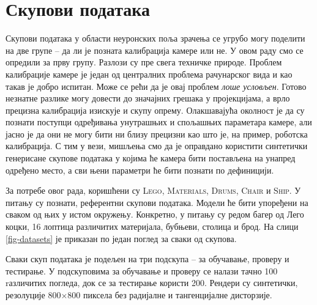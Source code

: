 \documentclass[12pt, a4paper, twoside]{book}
\numberwithin{equation}{chapter}
\numberwithin{theorem}{section}
\numberwithin{definition}{section}
\numberwithin{definitionChapter}{chapter}
\begin{document}
\chapter{Скупови података}
Скупови података у области неуронских поља зрачења се угрубо могу поделити на две групе -- да ли је позната
калибрација камере или не. У овом раду смо се опредили за прву групу. Разлози су  пре свега техничке природе.
Проблем калибрације камере је један од централних проблема рачунарског вида и као такав је добро испитан.
Може се рећи да је овај проблем \textit{лоше условљен}. Готово незнатне разлике могу довести до значајних грешака
у пројекцијама, а врло прецизна калибрација изискује и скупу опрему. Олакшавајућа околност је да су познати поступци
одређивања унутрашњих и спољашњих параметара камере, али јасно је да они не могу бити ни близу прецизни као што је,
на пример, роботска калибрација. С тим у вези, мишљења смо да је оправдано користити синтетички генерисане скупове
података у којима ће камера бити постављена на унапред одређено место, а сви њени параметри ће бити познати по дефиницији.

За потребе овог рада, коришћени су \textsc{Lego}, \textsc{Materials}, \textsc{Drums}, \textsc{Chair} и \textsc{Ship}.
У питању су познати, референтни скупови података. Модели ће бити упоређени на сваком од њих у истом окружењу.
Конкретно, у питању су редом багер од Лего коцки, 16 лоптица различитих материјала, бубњеви, столица и брод.
На слици \ref{fig-datasets} је приказан по један поглед за сваки од скупова.

Сваки скуп података је подељен на три подскупа -- за обучавање, проверу и тестирање. У подскуповима за обучавање и проверу
се налази тачно 100 rазличитих погледа, док се за тестирање користи 200. Рендери су синтетички, резолуције 800$\times$800
пиксела без радијалне и тангенцијалне дисторзије.
\end{document}
